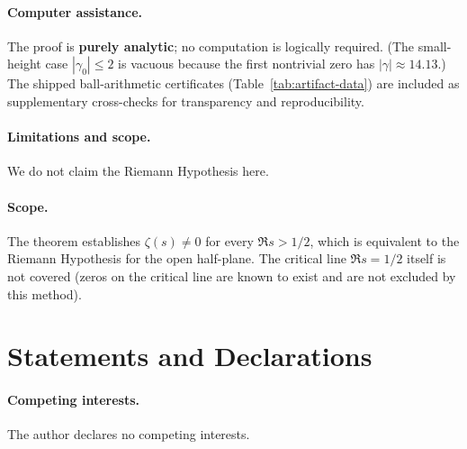 \documentclass[11pt]{amsart}
\theoremstyle{definition}
\theoremstyle{remark}
\begin{document}
\paragraph{Computer assistance.}
The proof is \textbf{purely analytic}; no computation is logically required.
(The small-height case $|\gamma_0|\le 2$ is vacuous because the first
nontrivial zero has $|\gamma|\approx 14.13$.)
The shipped ball-arithmetic certificates (Table~\ref{tab:artifact-data})
are included as supplementary cross-checks for transparency and reproducibility.

\paragraph{Limitations and scope.}
We do not claim the Riemann Hypothesis here.

\paragraph{Scope.}
The theorem establishes $\zeta(s)\neq 0$ for every $\Re s>1/2$,
which is equivalent to the Riemann Hypothesis for the open half-plane.
The critical line $\Re s=1/2$ itself is not covered
(zeros on the critical line are known to exist and are not excluded by this method).

\section*{Statements and Declarations}

\paragraph{Competing interests.}
The author declares no competing interests.
\end{document}
